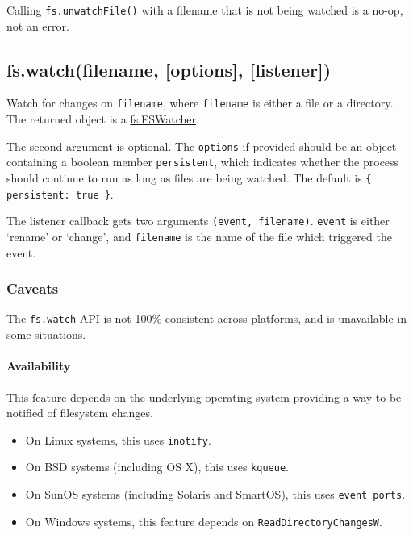 Calling \texttt{fs.unwatchFile()} with a filename that is not being
watched is a no-op, not an error.

\subsection{fs.watch(filename, {[}options{]}, {[}listener{]})}

\begin{Shaded}
\begin{Highlighting}[]
\NormalTok{: } \NormalTok{- }
\end{Highlighting}
\end{Shaded}

Watch for changes on \texttt{filename}, where \texttt{filename} is
either a file or a directory. The returned object is a
\hyperref[fs_class_fs_fswatcher]{fs.FSWatcher}.

The second argument is optional. The \texttt{options} if provided should
be an object containing a boolean member \texttt{persistent}, which
indicates whether the process should continue to run as long as files
are being watched. The default is \texttt{\{ persistent: true \}}.

The listener callback gets two arguments \texttt{(event, filename)}.
\texttt{event} is either `rename' or `change', and \texttt{filename} is
the name of the file which triggered the event.

\subsubsection{Caveats}

The \texttt{fs.watch} API is not 100\% consistent across platforms, and
is unavailable in some situations.

\paragraph{Availability}

This feature depends on the underlying operating system providing a way
to be notified of filesystem changes.

\begin{itemize}
\item
  On Linux systems, this uses \texttt{inotify}.
\item
  On BSD systems (including OS X), this uses \texttt{kqueue}.
\item
  On SunOS systems (including Solaris and SmartOS), this uses
  \texttt{event ports}.
\item
  On Windows systems, this feature depends on
  \texttt{ReadDirectoryChangesW}.
\end{itemize}

